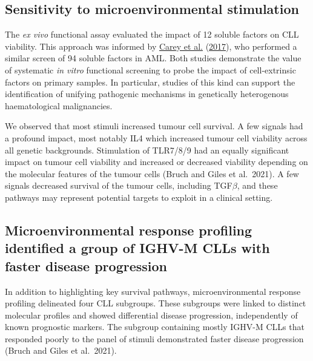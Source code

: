 \documentclass[11pt, a4paper, twosided]{book}
\begin{document}
\hypertarget{sensitivity-to-microenvironmental-stimulation}{%
\subsection{Sensitivity to microenvironmental stimulation}\label{sensitivity-to-microenvironmental-stimulation}}

The \emph{ex vivo} functional assay evaluated the impact of 12 soluble factors on CLL viability. This approach was informed by \protect\hyperlink{ref-Carey2017}{Carey et al.} (\protect\hyperlink{ref-Carey2017}{2017}), who performed a similar screen of 94 soluble factors in AML. Both studies demonstrate the value of systematic \emph{in vitro} functional screening to probe the impact of cell-extrinsic factors on primary samples. In particular, studies of this kind can support the identification of unifying pathogenic mechanisms in genetically heterogenous haematological malignancies.

We observed that most stimuli increased tumour cell survival. A few signals had a profound impact, most notably IL4 which increased tumour cell viability across all genetic backgrounds. Stimulation of TLR7/8/9 had an equally significant impact on tumour cell viability and increased or decreased viability depending on the molecular features of the tumour cells (Bruch and Giles et al.~2021). A few signals decreased survival of the tumour cells, including TGF\(\beta\), and these pathways may represent potential targets to exploit in a clinical setting.

\hypertarget{microenvironmental-response-profiling-identified-a-group-of-ighv-m-clls-with-faster-disease-progression}{%
\subsection{Microenvironmental response profiling identified a group of IGHV-M CLLs with faster disease progression}\label{microenvironmental-response-profiling-identified-a-group-of-ighv-m-clls-with-faster-disease-progression}}

In addition to highlighting key survival pathways, microenvironmental response profiling delineated four CLL subgroups. These subgroups were linked to distinct molecular profiles and showed differential disease progression, independently of known prognostic markers. The subgroup containing mostly IGHV-M CLLs that responded poorly to the panel of stimuli demonstrated faster disease progression (Bruch and Giles et al.~2021).
\end{document}
